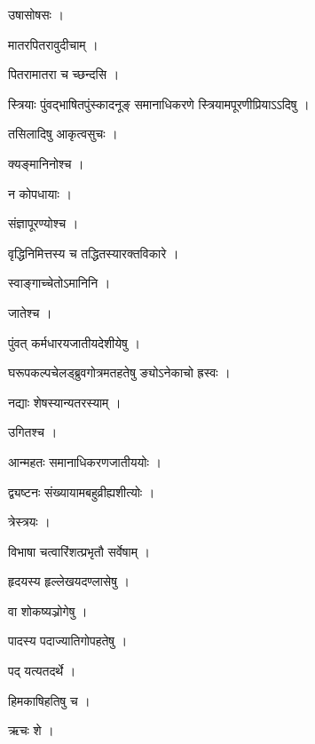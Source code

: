 \documentclass[10pt, openany]{book}
\begin{document}
\noindent उषासोषसः ।

\noindent मातरपितरावुदीचाम् ।

\noindent पितरामातरा च च्छन्दसि ।

\noindent स्त्रियाः पुंवद्भाषितपुंस्कादनूङ् समानाधिकरणे स्त्रियामपूरणीप्रियाऽऽदिषु ।

\noindent तसिलादिषु आकृत्वसुचः ।

\noindent क्यङ्मानिनोश्च ।

\noindent न कोपधायाः ।

\noindent संज्ञापूरण्योश्च ।

\noindent वृद्धिनिमित्तस्य च तद्धितस्यारक्तविकारे ।

\noindent स्वाङ्गाच्चेतोऽमानिनि ।

\noindent जातेश्च ।

\noindent पुंवत् कर्मधारयजातीयदेशीयेषु ।

\noindent घरूपकल्पचेलड्ब्रुवगोत्रमतहतेषु ङ्योऽनेकाचो ह्रस्वः ।

\noindent नद्याः शेषस्यान्यतरस्याम् ।

\noindent उगितश्च ।

\noindent आन्महतः समानाधिकरणजातीययोः ।

\noindent द्व्यष्टनः संख्यायामबहुव्रीह्यशीत्योः ।

\noindent त्रेस्त्रयः ।

\noindent विभाषा चत्वारिंशत्प्रभृतौ सर्वेषाम् ।

\noindent हृदयस्य हृल्लेखयदण्लासेषु ।

\noindent वा शोकष्यञ्रोगेषु ।

\noindent पादस्य पदाज्यातिगोपहतेषु ।

\noindent पद् यत्यतदर्थे ।

\noindent हिमकाषिहतिषु च ।

\noindent ऋचः शे ।
\end{document}
